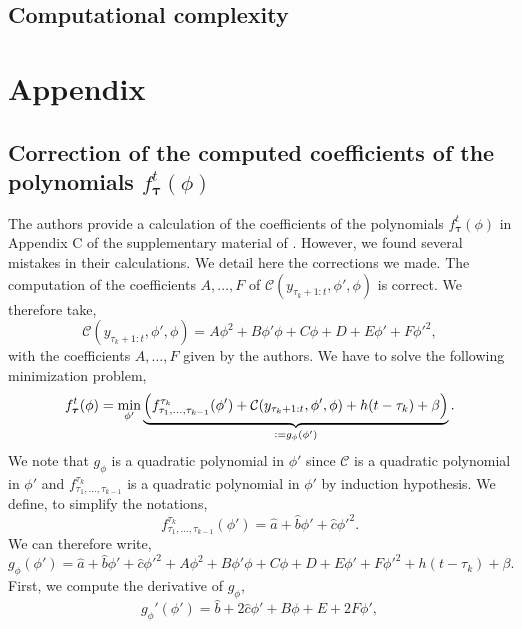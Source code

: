 \documentclass[11pt]{article}
\begin{document}
\subsection{Computational complexity}

\clearpage
\section{Appendix}
\subsection{Correction of the computed coefficients of the polynomials $f^t_{\boldsymbol{\tau}}(\phi)$}
The authors provide a calculation of the coefficients of the polynomials $f^t_{\boldsymbol{\tau}}(\phi)$ in Appendix C of the supplementary material of \cite{mainarticle}. However, we found several mistakes in their calculations. We detail here the corrections we made.
\jump
The computation of the coefficients $A,\dots,F$ of $\mathcal{C}(y_{\tau_k+1:t},\phi',\phi)$ is correct. We therefore take,
\begin{equation}
    \mathcal{C}(y_{\tau_k+1:t},\phi',\phi) = A\phi^2+B\phi'\phi + C\phi + D + E\phi'+F{\phi'}^2,
\end{equation}
with the coefficients $A,\dots,F$ given by the authors.
\jump
We have to solve the following minimization problem,
\begin{equation}
    f_{\boldsymbol{\tau}}^t(\phi) = \min_{\phi'}\underbrace{\left(f^{\tau_k}_{\tau_1,\dots,\tau_{k-1}}(\phi')+\mathcal{C}(y_{\tau_k+1:t},\phi',\phi)+h(t-\tau_k)+\beta\right)}_{\vcentcolon = g_\phi(\phi')}.
\end{equation}
We note that $g_\phi$ is a quadratic polynomial in $\phi'$ since $\mathcal{C}$ is a quadratic polynomial in $\phi'$ and $f^{\tau_k}_{\tau_1,\dots,\tau_{k-1}}$ is a quadratic polynomial in $\phi'$ by induction hypothesis. We define, to simplify the notations,
\begin{equation*}
    f^{\tau_k}_{\tau_1,\dots,\tau_{k-1}}(\phi') = \hat{a} + \hat{b}\phi' + \hat{c}{\phi'}^2.
\end{equation*}
We can therefore write,
\begin{equation*}
    g_\phi(\phi') = \hat{a} + \hat{b}\phi' + \hat{c}{\phi'}^2 + A\phi^2+B\phi'\phi + C\phi + D + E\phi'+F{\phi'}^2 + h(t-\tau_k)+\beta.
\end{equation*}
First, we compute the derivative of $g_\phi$,
\begin{equation*}
    g_\phi'(\phi') = \hat{b} + 2\hat{c}\phi' + B\phi + E + 2F\phi',
\end{equation*}
\end{document}
